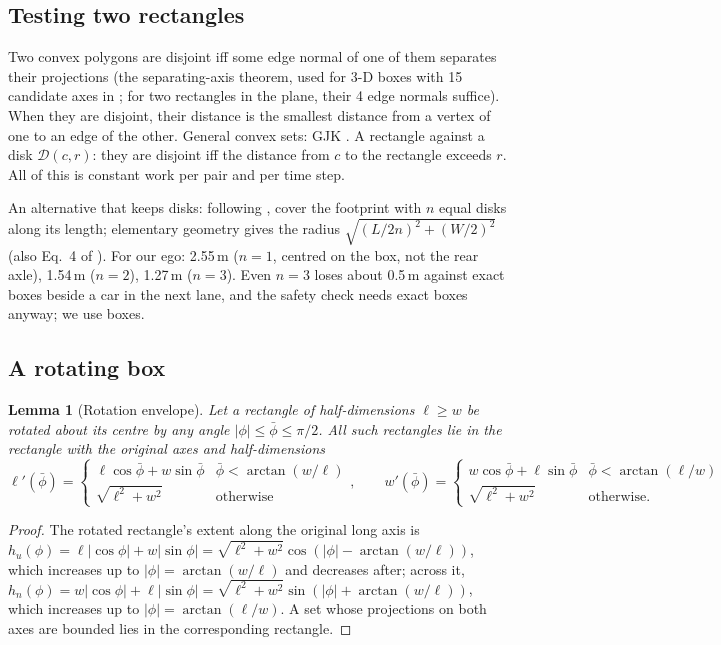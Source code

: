 \documentclass[11pt]{article}
\newtheorem{lemma}{Lemma}
\theoremstyle{definition}
\theoremstyle{remark}
\newcommand{\Disk}{\mathcal{D}}
\begin{document}
\subsection{Testing two rectangles}
Two convex polygons are disjoint iff some edge normal of one of them separates their projections
(the separating-axis theorem, used for 3-D boxes with 15 candidate axes in \cite{gottschalk1996}; for
two rectangles in the plane, their 4 edge normals suffice). When they are disjoint, their distance is the
smallest distance from a vertex of one to an edge of the other. General convex sets: GJK
\cite{gilbert1988}. A rectangle against a disk $\Disk(c,r)$: they are disjoint iff the distance from $c$
to the rectangle exceeds $r$. All of this is constant work per pair and per time step.

An alternative that keeps disks: following \cite{ziegler2010}, cover the footprint with $n$ equal disks
along its length; elementary geometry gives the radius $\sqrt{(L/2n)^2+(W/2)^2}$ (also Eq.~4 of
\cite{tolksdorf2024}). For our ego: 2.55\,m ($n=1$, centred on the box, not the rear axle), 1.54\,m ($n=2$),
1.27\,m ($n=3$). Even $n=3$ loses about 0.5\,m against exact boxes beside a car in the next lane, and the
safety check needs exact boxes anyway; we use boxes.

\subsection{A rotating box}
\begin{lemma}[Rotation envelope]\label{lem:rot}
Let a rectangle of half-dimensions $\ell\ge w$ be rotated about its centre by any angle
$|\phi|\le\bar\phi\le\pi/2$. All such rectangles lie in the rectangle with the original axes and
half-dimensions
\[
\ell'(\bar\phi)=\begin{cases}\ell\cos\bar\phi+w\sin\bar\phi & \bar\phi<\arctan(w/\ell)\\ \sqrt{\ell^2+w^2} & \text{otherwise}\end{cases},
\qquad
w'(\bar\phi)=\begin{cases}w\cos\bar\phi+\ell\sin\bar\phi & \bar\phi<\arctan(\ell/w)\\ \sqrt{\ell^2+w^2} & \text{otherwise.}\end{cases}
\]
\end{lemma}
\begin{proof}
The rotated rectangle's extent along the original long axis is
$h_u(\phi)=\ell|\cos\phi|+w|\sin\phi|=\sqrt{\ell^2+w^2}\cos(|\phi|-\arctan(w/\ell))$, which increases up to
$|\phi|=\arctan(w/\ell)$ and decreases after; across it,
$h_n(\phi)=w|\cos\phi|+\ell|\sin\phi|=\sqrt{\ell^2+w^2}\sin(|\phi|+\arctan(w/\ell))$, which increases up to
$|\phi|=\arctan(\ell/w)$. A set whose projections on both axes are bounded lies in the corresponding
rectangle.
\end{proof}
\end{document}
